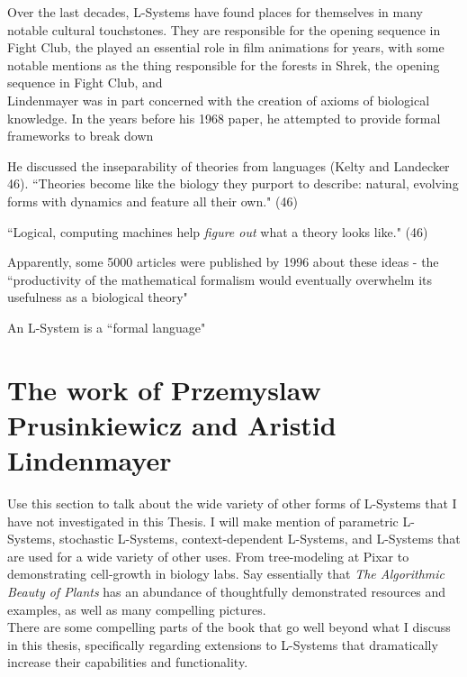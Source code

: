 \documentclass[12pt,twoside]{reedthesis}
\begin{document}
	Over the last decades, L-Systems have found places for themselves in many notable cultural touchstones. They are responsible for the opening sequence in Fight Club, the
	played an essential role in film animations for years, with some notable mentions as the thing responsible for the forests in Shrek, the opening sequence in Fight Club, and  \\
	
	Lindenmayer was in part concerned with the creation of axioms of biological knowledge. In the years before his 1968 paper, he attempted to provide formal frameworks to break down 
	
	He discussed the inseparability of theories from languages (Kelty and Landecker 46). ``Theories become like the biology they purport to describe: natural, evolving forms with dynamics and feature all their own." (46)
	
	``Logical, computing machines help \textit{figure out} what a theory looks like." (46)
	
	
	Apparently, some 5000 articles were published by 1996 about these ideas - the ``productivity of the mathematical formalism would eventually overwhelm its usefulness as a biological theory"
	
	An L-System is a ``formal language"
	


\section{The work of Przemyslaw Prusinkiewicz and Aristid Lindenmayer}

Use this section to talk about the wide variety of other forms of L-Systems that I have not investigated in this Thesis. I will make mention of parametric L-Systems, stochastic L-Systems, context-dependent L-Systems, and L-Systems that are used for a wide variety of other uses. From tree-modeling at Pixar to demonstrating cell-growth in biology labs.
Say essentially that \textit{The Algorithmic Beauty of Plants} has an abundance of thoughtfully demonstrated resources and examples, as well as many compelling pictures.\\

 There are some compelling parts of the book that go well beyond what I discuss in this thesis, specifically regarding extensions to L-Systems that dramatically increase their capabilities and functionality.\\

	
	
\end{document}
